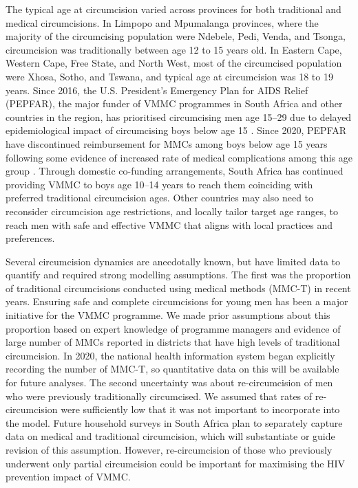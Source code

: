 \documentclass{article}
\begin{document}
The typical age at circumcision varied across provinces for both traditional and medical circumcisions. In Limpopo and Mpumalanga provinces, where the majority of the circumcising population were Ndebele, Pedi, Venda, and Tsonga, circumcision was traditionally between age 12 to 15 years old. In Eastern Cape, Western Cape, Free State, and North West, most of the circumcised population were Xhosa, Sotho, and Tswana, and typical age at circumcision was 18 to 19 years. Since 2016, the U.S. President's Emergency Plan for AIDS Relief (PEPFAR), the major funder of VMMC programmes in South Africa and other countries in the region, has prioritised circumcising men age 15--29 due to delayed epidemiological impact of circumcising boys below age 15 \autocite{davis2018progress}. Since 2020, PEPFAR have discontinued reimbursement for MMCs among boys below age 15 years following some evidence of increased rate of medical complications among this age group \autocite{world2020preventing}. Through domestic co-funding arrangements, South Africa has continued providing VMMC to boys age 10--14 years to reach them coinciding with preferred traditional circumcision ages. Other countries may also need to reconsider circumcision age restrictions, and locally tailor target age ranges, to reach men with safe and effective VMMC that aligns with local practices and preferences.

Several circumcision dynamics are anecdotally known, but have limited data to quantify and required strong modelling assumptions. The first was  the proportion of traditional circumcisions conducted using medical methods (MMC-T) in recent years. Ensuring safe and complete circumcisions for young men has been a major initiative for the VMMC programme. We made prior assumptions about this proportion based on expert knowledge of programme managers and evidence of large number of MMCs reported in districts that have high levels of traditional circumcision. In 2020, the national health information system began explicitly recording the number of MMC-T, so quantitative data on this will be available for future analyses. The second uncertainty was about re-circumcision of men who were previously traditionally circumcised. We assumed that rates of re-circumcision were sufficiently low that it was not important to incorporate into the model. Future household surveys in South Africa plan to separately capture data on medical and traditional circumcision, which will substantiate or guide revision of this assumption. However, re-circumcision of those who previously underwent only partial circumcision could be important for maximising the HIV prevention impact of VMMC.
\end{document}
